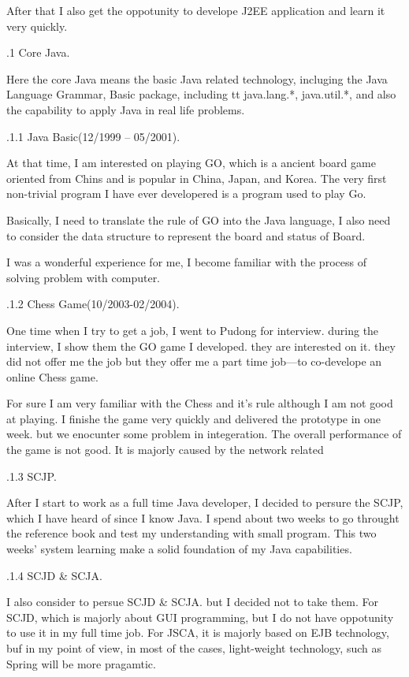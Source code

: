 After that I also get the oppotunity to develope J2EE application and learn it 
very quickly.



.1 Core Java.\par
Here the core Java means the basic Java related technology, incluging the Java Language 
Grammar, Basic package, including {tt java.lang.*, java.util.*}, and also the 
capability to apply Java in real life problems.

.1.1 Java Basic(12/1999 -- 05/2001).\par
At that time, I am interested on playing GO, which is a ancient board game 
oriented from Chins and is popular in China, Japan, and Korea. The very first 
non-trivial program I have ever developered is a program used to play Go.

Basically, I need to translate the rule of GO into the Java language, I also 
need to consider the data structure to represent the board and status of Board.

I was a wonderful experience for me, I become familiar with the process of 
solving problem with computer.

.1.2 Chess Game(10/2003-02/2004).\par
One time when I try to get a job, I went to Pudong for interview. during the interview, I 
show them the GO game I developed. they are interested on it. they did not offer me the job
but they offer me a part time job---to co-develope an online Chess game.

For sure I am very familiar with the Chess and it's rule although I am not good at playing.
I finishe the game very quickly and delivered the prototype in one week. but we enocunter 
some problem in integeration. The overall performance of the game is not good. It is majorly 
caused by the network related 

.1.3 SCJP.\par
After I start to work as a full time Java developer, I decided to persure the SCJP, which I have
heard of since I know Java. I spend about two weeks to go throught the reference book and 
test my understanding with small program. This two weeks' system learning make a solid foundation 
of my Java capabilities.

.1.4 SCJD \& SCJA.\par
I also consider to persue SCJD \& SCJA. but I decided not to take them. For SCJD, which is majorly
about GUI programming, but I do not have oppotunity to use it in my full time job. For JSCA, it is
majorly  based on EJB technology, buf in my point of view, in most of the cases, light-weight 
technology, such as Spring will be more pragamtic.

